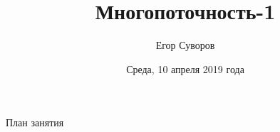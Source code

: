\documentclass[utf8,xcolor=table]{beamer}
\title[Многопоточность-1]{Многопоточность-1}
\author{Егор Суворов}
\institute[СПбГУ]{Курс <<Парадигмы и языки программирования>>, группа 18.Б09-пу}
\date[10.04.2019]{Среда, 10 апреля 2019 года}
\begin{document}
\begin{frame}
\titlepage
\end{frame}

\begin{frame}{План занятия}
	\tableofcontents
\end{frame}









\end{document}
